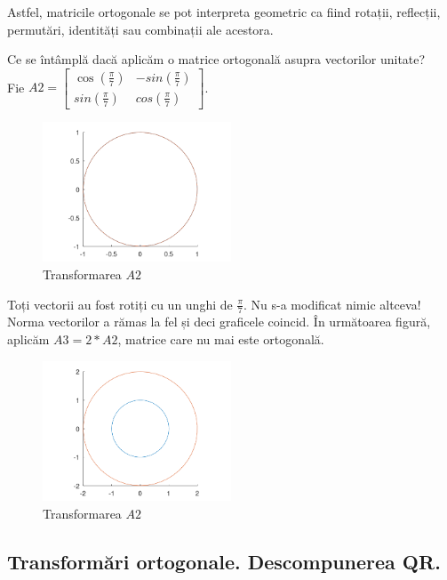 \documentclass{exam}
\begin{document}
\par Astfel, matricile ortogonale se pot interpreta geometric ca fiind rotații,
reflecții, permutări, identități sau combinații ale acestora.

\par Ce se întâmplă dacă aplicăm o matrice ortogonală asupra vectorilor unitate? \\
Fie $A2 = \begin{bmatrix} \cos(\frac{\pi}{7}) & -sin(\frac{\pi}{7}) \\ sin(\frac{\pi}{7}) & cos(\frac{\pi}{7}) \end{bmatrix}$.

\begin{figure}[ht]
	\centering
	\includegraphics[width=0.5\textwidth]{plot3}
	\caption{Transformarea $A2$}
	\label{fig:3}
\end{figure}

\newpage
\par Toți vectorii au fost rotiți cu un unghi de $\frac{\pi}{7}$. Nu s-a
modificat nimic altceva! Norma vectorilor a rămas la fel și deci graficele
coincid. În următoarea figură, aplicăm $A3 = 2 * A2$, matrice care nu mai este
ortogonală.

\begin{figure}[ht]
	\centering
	\includegraphics[width=0.5\textwidth]{plot4}
	\caption{Transformarea $A2$}
	\label{fig:4}
\end{figure}

\subsection{Transformări ortogonale. Descompunerea QR.}
\end{document}
